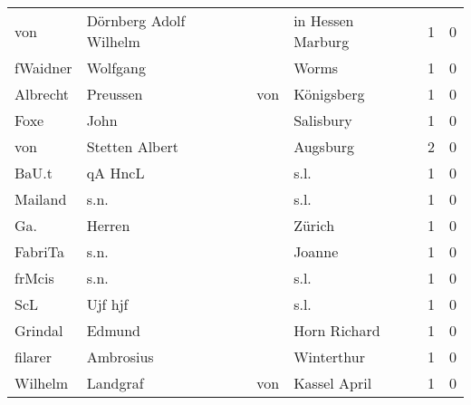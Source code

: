 \begin{center}
\begin{tiny}
\begin{longtabu}{llllrr}
                      von &             Dörnberg Adolf Wilhelm &             &                           in Hessen Marburg &          1 &         0 \\
                 fWaidner &                           Wolfgang &             &                                       Worms &          1 &         0 \\
                 Albrecht &                           Preussen &         von &                                  Königsberg &          1 &         0 \\
                     Foxe &                               John &             &                                   Salisbury &          1 &         0 \\
                      von &                     Stetten Albert &             &                                    Augsburg &          2 &         0 \\
                    BaU.t &                            qA HncL &             &                                        s.l. &          1 &         0 \\
                  Mailand &                               s.n. &             &                                        s.l. &          1 &         0 \\
                      Ga. &                             Herren &             &                                      Zürich &          1 &         0 \\
                  FabriTa &                               s.n. &             &                                      Joanne &          1 &         0 \\
                   frMcis &                               s.n. &             &                                        s.l. &          1 &         0 \\
                      ScL &                            Ujf hjf &             &                                        s.l. &          1 &         0 \\
                  Grindal &                             Edmund &             &                                Horn Richard &          1 &         0 \\
                  filarer &                          Ambrosius &             &                                  Winterthur &          1 &         0 \\
                  Wilhelm &                           Landgraf &         von &                                Kassel April &          1 &         0 \\

\end{longtabu}
\end{tiny}
\end{center}
